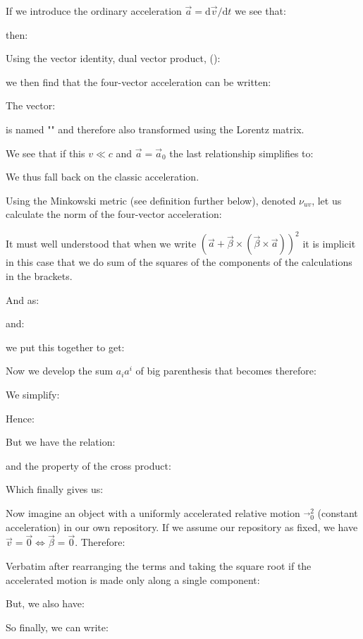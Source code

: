 	If we introduce the ordinary acceleration $\vec{a}=\mathrm{d}\vec{v}/\mathrm{d}t$ we see that:
	
	then:
	
	Using the vector identity, dual vector product, ():
	
	we then find that the four-vector acceleration can be written:
	
	
	The vector:
	
	is named "" and therefore also transformed using the Lorentz matrix.
	
	We see that if this $v\ll c$ and $\vec{a}=\vec{a}_0$ the last relationship simplifies to:
	
	We thus fall back on the classic acceleration.

	Using the Minkowski metric (see definition further below), denoted $\nu_{uv}$, let us calculate the norm of the four-vector acceleration:
	
	\begin{tcolorbox}[title=Remark,colframe=black,arc=10pt]
	It must well understood that when we write $(\vec{a}+\vec{\beta}\times(\vec{\beta}\times\vec{a}))^2$ it is implicit in this case that we do sum of the squares of the components of the calculations in the brackets.
	\end{tcolorbox}	
	And as:
	
	and:
	
	we put this together to get:
	
	Now we develop the sum $a_ia^i$ of big parenthesis that becomes therefore:
	
	We simplify:
	
	Hence:
	
	But we have the relation:
	
	and the property of the cross product:
	
	Which finally gives us:
	
	Now imagine an object with a uniformly accelerated relative motion $\vec{}_0^2$ (constant acceleration) in our own repository. If we assume our repository as fixed, we have $\vec{v}=\vec{0}\Leftrightarrow \vec{\beta}=\vec{0}$. Therefore:
	
	Verbatim after rearranging the terms and taking the square root if the accelerated motion is made only along a single component:
	
	But, we also have:
	
	So finally, we can write:
	
